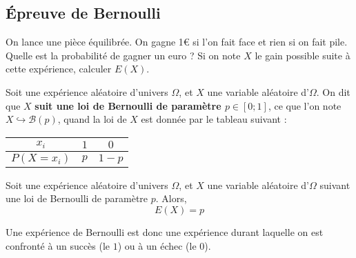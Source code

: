 \documentclass{article}
\begin{document}
\subsection{Épreuve de Bernoulli}
\begin{example}
On lance une pièce équilibrée. On gagne 1€ si l'on fait face et rien si on fait pile. Quelle est la probabilité de gagner un euro ? Si on note $X$ le gain possible suite à cette expérience, calculer $E(X)$.

\emptybox{3cm}
\end{example}
\begin{tcolorbox}
\begin{definition}
Soit une expérience aléatoire d'univers $\Omega$, et $X$ une variable aléatoire d'$\Omega$. On dit que $X$ \textbf{suit une loi de Bernoulli de paramètre $p \in [0;1]$}, ce que l'on note $X \hookrightarrow \mathcal{B}(p)$, quand la loi de $X$ est donnée par le tableau suivant :
\begin{center}
\begin{tabular}{|c|c|c|}
\hline
$x_i$&$1$&$0$\\
\hline
$P(X = x_i)$&$p$&$1 - p$\\
\hline
\end{tabular}
\end{center}
\end{definition}
\end{tcolorbox}
\begin{proposition}
Soit une expérience aléatoire d'univers $\Omega$, et $X$ une variable aléatoire d'$\Omega$ suivant une loi de Bernoulli de paramètre $p$. Alors,
\begin{equation*}
E(X) = p
\end{equation*}
\end{proposition}
\begin{remark}
Une expérience de Bernoulli est donc une expérience durant laquelle on est confronté à un succès (le $1$) ou à un échec (le $0$).
\end{remark}
\end{document}
